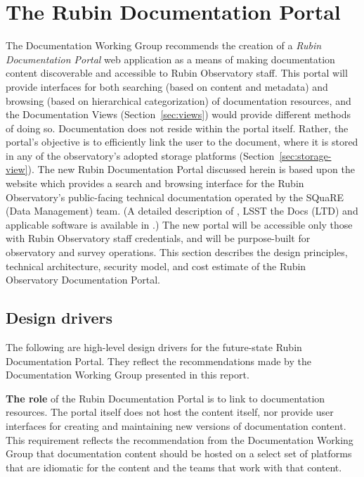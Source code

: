 \section{The Rubin Documentation Portal}
\label{sec:DocPortal}

The Documentation Working Group recommends the creation of a \emph{Rubin Documentation Portal} web application as a means of making documentation content discoverable and accessible to Rubin Observatory staff.
This portal will provide interfaces for both searching (based on content and metadata) and browsing (based on hierarchical categorization) of documentation resources, and the Documentation Views (Section~\ref{sec:views}) would provide different methods of doing so.
Documentation does not reside within the portal itself.
Rather, the portal's objective is to efficiently link the user to the document, where it is stored in any of the observatory's adopted storage platforms (Section~\ref{sec:storage-view}).
The new Rubin Documentation Portal discussed herein is based upon the website \href{www.lsst.io} \citep{lsst.io-cite} which provides a search and browsing interface for the Rubin Observatory's public-facing technical documentation operated by the SQuaRE (Data Management) team.
(A detailed description of \href{www.lsst.io}, LSST the Docs (LTD) and applicable software is available in .)
The new portal will be accessible only those with Rubin Observatory staff credentials, and will be purpose-built for observatory and survey operations.
This section describes the design principles, technical architecture, security model, and cost estimate of the Rubin Observatory Documentation Portal.

\subsection{Design drivers}

The following are high-level design drivers for the future-state Rubin Documentation Portal. 
They reflect the recommendations made by the Documentation Working Group presented in this report.

\textbf{The role} of the Rubin Documentation Portal is to link to documentation resources.
The portal itself does not host the content itself, nor provide user interfaces for creating and maintaining new versions of documentation content.
This requirement reflects the recommendation from the Documentation Working Group that documentation content should be hosted on a select set of platforms that are idiomatic for the content and the teams that work with that content.

